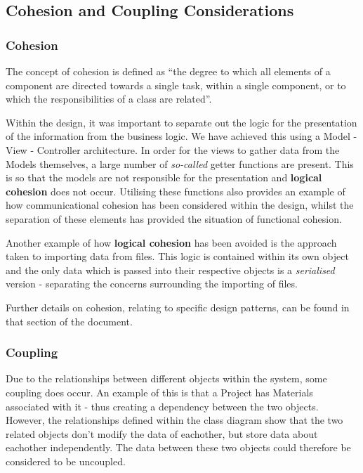 \documentclass[
  english,
  a4paper,
,tablecaptionabove
]{scrartcl}
\begin{document}
\newpage

\hypertarget{cohesion-and-coupling-considerations}{%
\subsection{Cohesion and Coupling
Considerations}\label{cohesion-and-coupling-considerations}}

\hypertarget{cohesion}{%
\subsubsection{Cohesion}\label{cohesion}}

The concept of cohesion is defined as \enquote{the degree to which all
elements of a component are directed towards a single task, within a
single component, or to which the responsibilities of a class are
related}.

Within the design, it was important to separate out the logic for the
presentation of the information from the business logic. We have
achieved this using a Model - View - Controller architecture. In order
for the views to gather data from the Models themselves, a large number
of \emph{so-called} getter functions are present. This is so that the
models are not responsible for the presentation and \textbf{logical
cohesion} does not occur. Utilising these functions also provides an
example of how communicational cohesion has been considered within the
design, whilst the separation of these elements has provided the
situation of functional cohesion.

Another example of how \textbf{logical cohesion} has been avoided is the
approach taken to importing data from files. This logic is contained
within its own object and the only data which is passed into their
respective objects is a \emph{serialised} version - separating the
concerns surrounding the importing of files.

Further details on cohesion, relating to specific design patterns, can
be found in that section of the document.

\hypertarget{coupling}{%
\subsubsection{Coupling}\label{coupling}}

Due to the relationships between different objects within the system,
some coupling does occur. An example of this is that a Project has
Materials associated with it - thus creating a dependency between the
two objects. However, the relationships defined within the class diagram
show that the two related objects don't modify the data of eachother,
but store data about eachother independently. The data between these two
objects could therefore be considered to be uncoupled.
\end{document}
